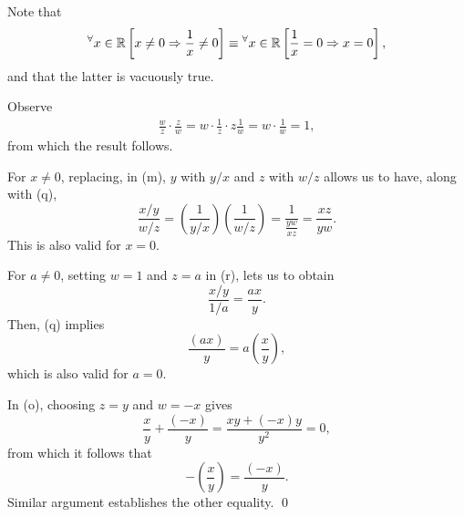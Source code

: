 \documentclass[a4paper,12pt]{article}
\begin{document}
\begin{sol}
	Note that
	\begin{equation*}
		{}^{\forall}  x\in \mathbb{R}
		\left[
			x\neq 0
			\Rightarrow
			\frac{1}{x}\neq 0
			\right]
		\equiv
		{}^{\forall}  x\in \mathbb{R}
		\left[
			\frac{1}{x} = 0
			\Rightarrow
			x= 0
			\right],
	\end{equation*}
	and that
	the latter is vacuously true.
	
	Observe
	\begin{eqnarray*}
		\frac{w}{z}\cdot \frac{z}{w}
		=
		w\cdot \frac{1}{z} \cdot z \frac{1}{w}
		=
		w \cdot \frac{1}{w}
		=
		1,
	\end{eqnarray*}
	from which the result follows.
	
	For
	\( x\neq 0 \),
	replacing, in (m), 
	\( y \)
	with
	\( y/x \)
	and
	\( z \)
	with
	\( w/z \)
	allows us to have, along with (q),
	\begin{equation*}
		\frac{x/y}{w/z}
		=
		\left( \frac{1}{y/x} \right)\left( \frac{1}{w/z} \right)
		=
		\frac{1}{\frac{yw}{xz}}
		=
		\frac{xz}{yw}.
	\end{equation*}
	This is also valid for
	\( x=0 \).
	
	For
	\( a \neq 0 \),
	setting
	\( w=1 \)
	and
	\( z=a \)
	in (r),
	lets us to obtain
	\begin{equation*}
		\frac{x/y}{1/a}
		=
		\frac{ax}{y}.
	\end{equation*}
	Then, (q) implies
	\begin{equation*}
		\frac{(ax)}{y}
		=
		a \left( \frac{x}{y} \right),
	\end{equation*}
	which is also valid for 
	\( a=0 \).
	
	In (o),
	choosing
	\( z=y \)
	and
	\( w=-x \)
	gives
	\begin{equation*}
		\frac{x}{y}
		+
		\frac{(-x)}{y}
		=
		\frac{xy+(-x)y}{y^2}
		=
		0,
	\end{equation*}
	from which it follows that
	\begin{equation*}
		-\left( \frac{x}{y} \right)
		=
		\frac{(-x)}{y}.
	\end{equation*}
	Similar argument establishes the other equality.
	\qed
\end{sol}
\end{document}
